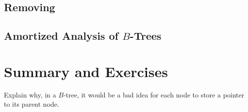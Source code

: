 \subsection{Removing}




\subsection{Amortized Analysis of $B$-Trees}

\section{Summary and Exercises}
\begin{exc}
  \item Explain why, in a $B$-tree, it would be a bad idea for each node
    to store a pointer to its parent node.
\end{exc}


